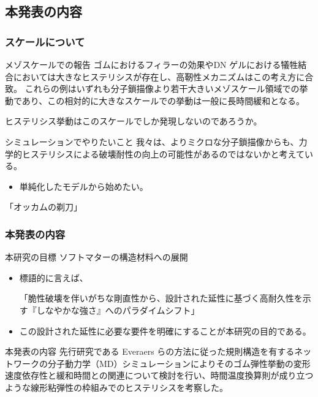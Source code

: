 \documentclass[11pt, dvipdfmx]{beamer}
\begin{document}
\subsection{本発表の内容}

\begin{frame}
\frametitle{スケールについて}


\begin{block}{メゾスケールでの報告}
ゴムにおけるフィラーの効果やDN ゲルにおける犠牲結合においては大きなヒステリシスが存在し、高靭性メカニズムはこの考え方に合致。
これらの例はいずれも分子鎖描像より若干大きいメゾスケール領域での挙動であり、この相対的に大きなスケールでの挙動は一般に長時間緩和となる。

ヒステリシス挙動はこのスケールでしか発現しないのであろうか。 
\end{block}


\begin{alertblock}{\Large シミュレーションでやりたいこと}
我々は、よりミクロな分子鎖描像からも、力学的ヒステリシスによる破壊耐性の向上の可能性があるのではないかと考えている。
\begin{itemize}
\item
単純化したモデルから始めたい。
\end{itemize}
\centering
\Large
\alert{「オッカムの剃刀」}
\end{alertblock}

\end{frame}

\begin{frame}
\frametitle{本発表の内容}

\begin{exampleblock}{本研究の目標}
ソフトマターの構造材料への展開

\begin{itemize}
\item
標語的に言えば、

「脆性破壊を伴いがちな剛直性から、設計された延性に基づく高耐久性を示す『しなやかな強さ』へのパラダイムシフト」
\item
この設計された延性に必要な要件を明確にすることが本研究の目的である。
\end{itemize}
\end{exampleblock}

\begin{block}{本発表の内容}
先行研究である Everaers らの方法に従った規則構造を有するネットワークの分子動力学（MD）シミュレーションによりそのゴム弾性挙動の変形速度依存性と緩和時間との関連について検討を行い、時間温度換算則が成り立つような線形粘弾性の枠組みでのヒステリシスを考察した。
\end{block}
\end{frame}
\end{document}
